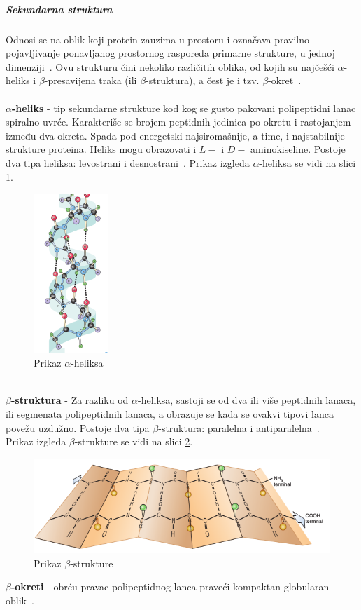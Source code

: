 \subparagraph{Sekundarna struktura}
Odnosi se na oblik koji protein zauzima u prostoru i označava pravilno pojavljivanje ponavljanog prostornog rasporeda primarne strukture, u jednoj dimenziji~\cite{medbio}.
Ovu strukturu čini nekoliko različitih oblika, od kojih su najčešći $\alpha$-heliks i $\beta$-presavijena traka (ili $\beta$-struktura), a čest je i tzv. $\beta$-okret~\cite{spasic}.\\\\
\textbf{$\alpha$-heliks} - tip sekundarne strukture kod kog se gusto pakovani polipeptidni lanac spiralno uvrće. Karakteriše se brojem peptidnih jedinica po okretu i rastojanjem između dva okreta. Spada pod energetski najsiromašnije, a time, i najstabilnije strukture proteina. Heliks mogu obrazovati i $L-$ i $D-$ aminokiseline. Postoje dva tipa heliksa: levostrani i desnostrani~\cite{spasic}. Prikaz izgleda $\alpha$-heliksa se vidi na slici \ref{fig:aheliks}.
\begin{figure}[h]
	\centering
    \includegraphics[width=0.25\textwidth]{Figures/BO/ahelix.png}
    \caption{Prikaz $\alpha$-heliksa~\cite{bmbg}}
    \label{fig:aheliks}
\end{figure}
 \\
\textbf{$\beta$-struktura} - Za razliku od $\alpha$-heliksa, sastoji se od dva ili više peptidnih lanaca, ili segmenata polipeptidnih lanaca, a obrazuje se kada se ovakvi tipovi lanca povežu uzdužno. Postoje dva tipa $\beta$-struktura: paralelna i antiparalelna~\cite{spasic}.\\
Prikaz izgleda $\beta$-strukture se vidi na slici \ref{fig:beta}.
\begin{figure}[h]
	\centering
    \includegraphics[width=1\textwidth]{Figures/BO/beta.png}
    \caption{Prikaz $\beta$-strukture~\cite{bmbg}}
    \label{fig:beta}
\end{figure}
\textbf{$\beta$-okreti} - obrću pravac polipeptidnog lanca praveći kompaktan globularan oblik~\cite{lippincott}. 
 
